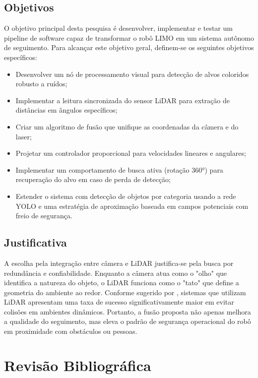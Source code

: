 \subsection{Objetivos}

O objetivo principal desta pesquisa é desenvolver, implementar e testar um pipeline de software capaz de transformar o robô LIMO em um sistema autônomo de seguimento. Para alcançar este objetivo geral, definem-se os seguintes objetivos específicos:
\begin{itemize}
    \item Desenvolver um nó de processamento visual para detecção de alvos coloridos robusto a ruídos;
    \item Implementar a leitura sincronizada do sensor LiDAR para extração de distâncias em ângulos específicos;
    \item Criar um algoritmo de fusão que unifique as coordenadas da câmera e do laser;
    \item Projetar um controlador proporcional para velocidades lineares e angulares;
    \item Implementar um comportamento de busca ativa (rotação 360°) para recuperação do alvo em caso de perda de detecção;
    \item Estender o sistema com detecção de objetos por categoria usando a rede YOLO e uma estratégia de aproximação baseada em campos potenciais com freio de segurança.
\end{itemize}

\subsection{Justificativa}

A escolha pela integração entre câmera e LiDAR justifica-se pela busca por redundância e confiabilidade. Enquanto a câmera atua como o "olho" que identifica a natureza do objeto, o LiDAR funciona como o "tato" que define a geometria do ambiente ao redor. Conforme sugerido por \cite{nguyen2020lidar}, sistemas que utilizam LiDAR apresentam uma taxa de sucesso significativamente maior em evitar colisões em ambientes dinâmicos. Portanto, a fusão proposta não apenas melhora a qualidade do seguimento, mas eleva o padrão de segurança operacional do robô em proximidade com obstáculos ou pessoas.


\newpage
\section{Revisão Bibliográfica}

